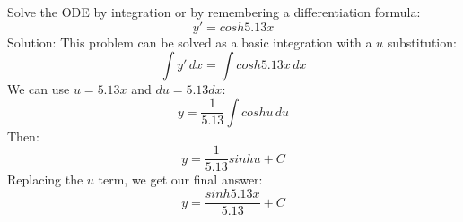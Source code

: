 \documentclass[12pt, letterpaper]{article}
\begin{document}
\setlength\parindent{0pt}
Solve the ODE by integration or by remembering a differentiation formula: 
\[ y' = cosh5.13x \]
Solution:
This problem can be solved as a basic integration with a $u$ substitution:
\[ \int{y'}\,dx = \int{cosh5.13x}\,dx \]
We can use $u = 5.13x$ and $du = 5.13dx$:
\[ y = \frac{1}{5.13}\int{coshu}\,du \]
Then:
\[ y = \frac{1}{5.13}sinhu + C \]
Replacing the $u$ term, we get our final answer:
\[ y = \frac{sinh5.13x}{5.13} + C \]
\end{document}
